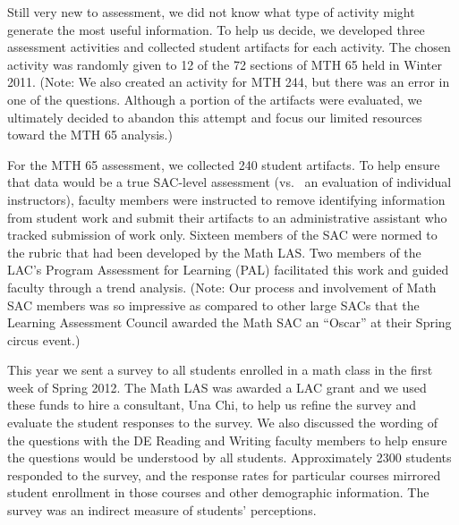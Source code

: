 \begin{description}
	      Still very new to assessment, we did not know what type of activity might generate the most useful information.
	      To help us decide, we developed three assessment activities and collected student artifacts for each activity.
	      The chosen activity was randomly given to 12 of the 72 sections of MTH 65 held in Winter 2011.
	      (Note: We also created an activity for MTH 244, but there was an error in one of the questions.
	      Although a portion of the artifacts were evaluated, we ultimately decided to abandon this attempt and focus our limited resources toward the MTH 65 analysis.)

	      For the MTH 65 assessment, we collected 240 student artifacts.
	      To help ensure that data would be a true SAC-level assessment (vs.
	      \ an evaluation of individual
	      instructors), faculty members were instructed to remove identifying information
	      from student work and submit their artifacts to an administrative assistant who
	      tracked submission of work only.
	      Sixteen members of the SAC were normed to the rubric that had been developed by the Math LAS.
	      Two members of the LAC's Program Assessment for Learning (PAL) facilitated this work and guided faculty through a trend analysis.
	      (Note: Our process and involvement of Math SAC members was so impressive as compared to other large SACs that the Learning Assessment Council awarded the Math SAC an ``Oscar'' at their Spring circus event.)

	\item[2011/12: Self Reflection and Professional Competence]

	      This year we sent a survey to all students enrolled in a math class in the first week of Spring 2012.
	      The Math LAS was awarded a LAC grant and we used these funds to hire a consultant, Una Chi, to help us refine the survey and evaluate the student responses to the survey.
	      We also discussed the wording of the questions with the DE Reading and Writing faculty members to help ensure the questions would be understood by all students.
	      Approximately 2300 students responded to the survey, and the response rates for particular courses mirrored student enrollment in those courses and other demographic information.
	      The survey was an indirect measure of students' perceptions.


\end{description}
